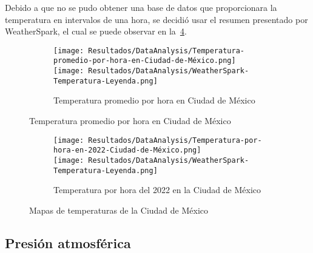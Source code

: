 			Debido a que no se pudo obtener una base de datos que proporcionara la temperatura en intervalos de una hora, se decidió usar el resumen presentado por WeatherSpark, el cual se puede observar en la~\cref{fig:Temperatura-CDMX}.
			
			\begin{figure}[H]
				\centering
				\begin{subfigure}[t]{\linewidth}
					\centering
					\texttt{[image: Resultados/DataAnalysis/Temperatura-promedio-por-hora-en-Ciudad-de-México.png]}
					\\\texttt{[image: Resultados/DataAnalysis/WeatherSpark-Temperatura-Leyenda.png]}
					\caption{Temperatura promedio por hora en Ciudad de México}
					\label{fig:Temperatura-promedio-por-hora-en-Ciudad-de-México}
				\end{subfigure}
			\end{figure}
			\begin{figure}[H]\ContinuedFloat
				\begin{subfigure}[t]{\linewidth}
					\centering
					\texttt{[image: Resultados/DataAnalysis/Temperatura-por-hora-en-2022-Ciudad-de-México.png]}\\
					\texttt{[image: Resultados/DataAnalysis/WeatherSpark-Temperatura-Leyenda.png]}
					\caption{Temperatura por hora del 2022 en la Ciudad de México}
					\label{fig:Temperatura-por-hora-en-2022-Ciudad-de-México}
				\end{subfigure}
				\caption{Mapas de temperaturas de la Ciudad de México}
				\label{fig:Temperatura-CDMX}
			\end{figure}
		
		\subsection{Presión atmosférica}
			
